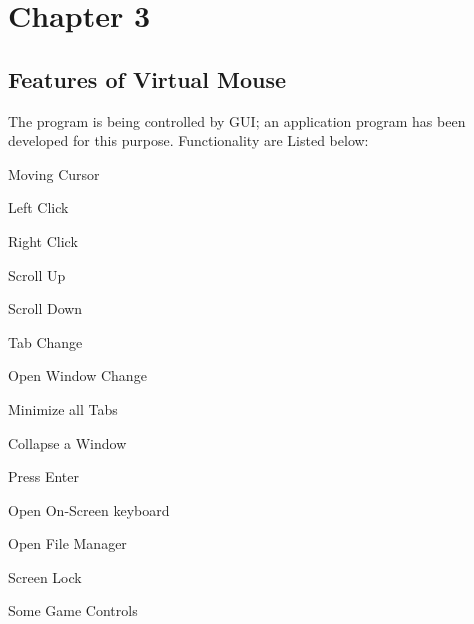 \documentclass[12pt,a4paper]{report}
\begin{document}
		{\vfill \chapter*{\centering \vfill Chapter 3 \vfill}\vfill}
		\thispagestyle{empty}
		\newpage
		\label{Features of Virtual Mouse}
		\section{Features of Virtual Mouse }
		The program is being controlled by GUI; an application program has been developed for this purpose. Functionality are Listed below: 
		\begin{center}
Moving Cursor 

Left Click 

Right Click 

Scroll Up

Scroll Down 

Tab Change

Open Window Change 

Minimize all Tabs 

Collapse a Window 

Press Enter 

Open On-Screen keyboard 

Open File Manager

Screen Lock 

Some Game Controls 
		\end{center}
		\label{Function 1 ( Cursor Moving)}
\end{document}

